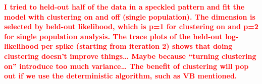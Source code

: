 \documentclass{article}
\begin{document}
	\textcolor{red}{\textbf{I tried to held-out half of the data in a speckled pattern and fit the model with clustering on and off (single population). The dimension is selected by held-out likelihood, which is p=1 for clustering on and p=2 for single population analysis. The trace plots of the held-out log-likelihood per spike (starting from iteration 2) shows that doing clustering doesn’t improve things… Maybe because “turning clustering on” introduce too much variance… The benefit of clustering will pop out if we use the deterministic algorithm, such as VB mentioned.}}
	
	\begin{figure}[h!]
		\centering
		
		

\end{figure}
\end{document}
